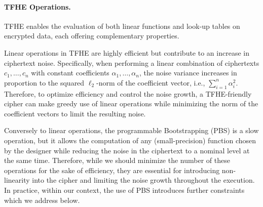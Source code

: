 %
%
%
 





\paragraph{\gls{TFHE} Operations.} \gls{TFHE} enables the evaluation of both linear functions and look-up tables on encrypted data, each offering complementary properties.

Linear operations in \gls{TFHE} are highly efficient but contribute to an increase in ciphertext noise. Specifically, when performing a linear combination of ciphertexts $c_1, \ldots, c_n$ with constant coefficients $\alpha_1, \ldots, \alpha_n$, the noise variance increases in proportion to the squared $\ell_2$-norm of the coefficient vector, i.e., $\sum_{i=1}^n \alpha_i^2$.  Therefore, to optimize efficiency and control the noise growth, a \gls{TFHE}-friendly cipher can make greedy use of linear operations while minimizing the norm of the coefficient vectors to limit the resulting noise.

Conversely to linear operations, the programmable Bootstrapping (\gls{PBS}) is a slow operation, but it allows the computation of any (small-precision) function chosen by the designer while reducing the noise in the ciphertext to a nominal level at the same time. Therefore, while we should minimize the number of these operations for the sake of efficiency, they are essential for introducing non-linearity into the cipher and limiting the noise growth throughout the execution. In practice, within our context, the use of \gls{PBS} introduces further constraints which we address below.

